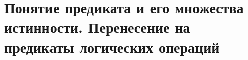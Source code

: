 \section{Понятие предиката и его множества истинности. Перенесение на предикаты логических операций}